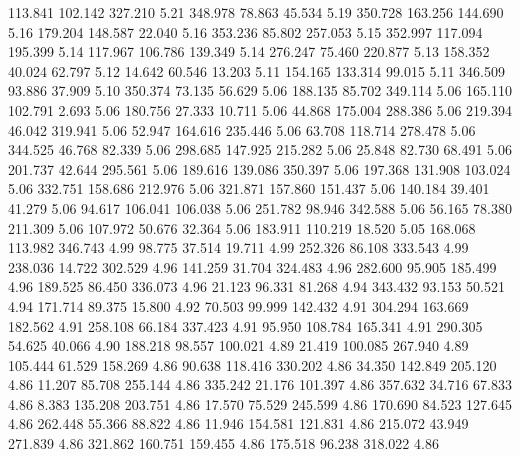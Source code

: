  113.841  102.142  327.210         5.21
 348.978   78.863   45.534         5.19
 350.728  163.256  144.690         5.16
 179.204  148.587   22.040         5.16
 353.236   85.802  257.053         5.15
 352.997  117.094  195.399         5.14
 117.967  106.786  139.349         5.14
 276.247   75.460  220.877         5.13
 158.352   40.024   62.797         5.12
  14.642   60.546   13.203         5.11
 154.165  133.314   99.015         5.11
 346.509   93.886   37.909         5.10
 350.374   73.135   56.629         5.06
 188.135   85.702  349.114         5.06
 165.110  102.791    2.693         5.06
 180.756   27.333   10.711         5.06
  44.868  175.004  288.386         5.06
 219.394   46.042  319.941         5.06
  52.947  164.616  235.446         5.06
  63.708  118.714  278.478         5.06
 344.525   46.768   82.339         5.06
 298.685  147.925  215.282         5.06
  25.848   82.730   68.491         5.06
 201.737   42.644  295.561         5.06
 189.616  139.086  350.397         5.06
 197.368  131.908  103.024         5.06
 332.751  158.686  212.976         5.06
 321.871  157.860  151.437         5.06
 140.184   39.401   41.279         5.06
  94.617  106.041  106.038         5.06
 251.782   98.946  342.588         5.06
  56.165   78.380  211.309         5.06
 107.972   50.676   32.364         5.06
 183.911  110.219   18.520         5.05
 168.068  113.982  346.743         4.99
  98.775   37.514   19.711         4.99
 252.326   86.108  333.543         4.99
 238.036   14.722  302.529         4.96
 141.259   31.704  324.483         4.96
 282.600   95.905  185.499         4.96
 189.525   86.450  336.073         4.96
  21.123   96.331   81.268         4.94
 343.432   93.153   50.521         4.94
 171.714   89.375   15.800         4.92
  70.503   99.999  142.432         4.91
 304.294  163.669  182.562         4.91
 258.108   66.184  337.423         4.91
  95.950  108.784  165.341         4.91
 290.305   54.625   40.066         4.90
 188.218   98.557  100.021         4.89
  21.419  100.085  267.940         4.89
 105.444   61.529  158.269         4.86
  90.638  118.416  330.202         4.86
  34.350  142.849  205.120         4.86
  11.207   85.708  255.144         4.86
 335.242   21.176  101.397         4.86
 357.632   34.716   67.833         4.86
   8.383  135.208  203.751         4.86
  17.570   75.529  245.599         4.86
 170.690   84.523  127.645         4.86
 262.448   55.366   88.822         4.86
  11.946  154.581  121.831         4.86
 215.072   43.949  271.839         4.86
 321.862  160.751  159.455         4.86
 175.518   96.238  318.022         4.86
